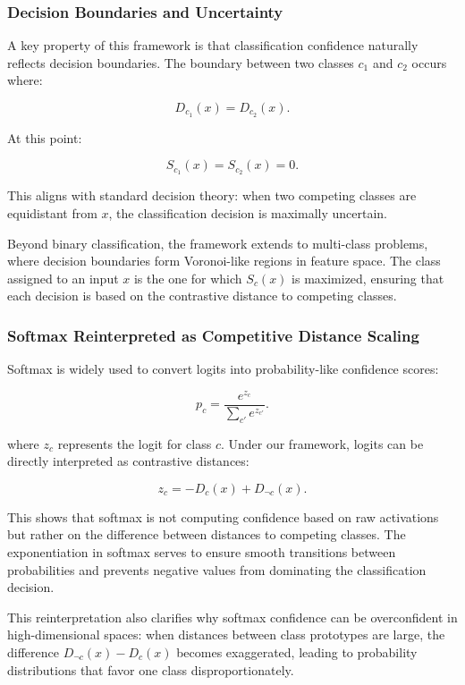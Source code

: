 \subsubsection{Decision Boundaries and Uncertainty}

A key property of this framework is that classification confidence naturally reflects decision boundaries. The boundary between two classes \( c_1 \) and \( c_2 \) occurs where:

\[
D_{c_1}(x) = D_{c_2}(x).
\]

At this point:

\[
S_{c_1}(x) = S_{c_2}(x) = 0.
\]

This aligns with standard decision theory: when two competing classes are equidistant from \( x \), the classification decision is maximally uncertain.

Beyond binary classification, the framework extends to multi-class problems, where decision boundaries form Voronoi-like regions in feature space. The class assigned to an input \( x \) is the one for which \( S_c(x) \) is maximized, ensuring that each decision is based on the contrastive distance to competing classes.

\subsubsection{Softmax Reinterpreted as Competitive Distance Scaling}

Softmax is widely used to convert logits into probability-like confidence scores:

\[
p_c = \frac{e^{z_c}}{\sum_{c'} e^{z_{c'}}}.
\]

where \( z_c \) represents the logit for class \( c \). Under our framework, logits can be directly interpreted as contrastive distances:

\[
z_c = -D_c(x) + D_{\neg c}(x).
\]

This shows that softmax is not computing confidence based on raw activations but rather on the difference between distances to competing classes. The exponentiation in softmax serves to ensure smooth transitions between probabilities and prevents negative values from dominating the classification decision.

This reinterpretation also clarifies why softmax confidence can be overconfident in high-dimensional spaces: when distances between class prototypes are large, the difference \( D_{\neg c}(x) - D_c(x) \) becomes exaggerated, leading to probability distributions that favor one class disproportionately.

